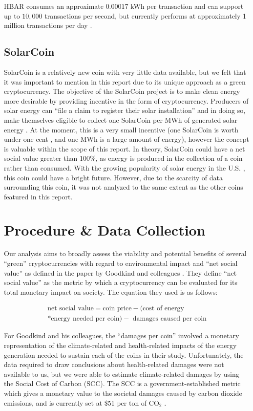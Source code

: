 \documentclass{article}
\begin{document}
HBAR consumes an approximate $0.00017$ kWh per transaction and can support up to $10,000$ transactions per second, but currently performs at approximately 1 million transactions per day \cite{hbar}.


\subsection{SolarCoin}
SolarCoin is a relatively new coin with very little data available, but we felt that it was important to mention in this report due to its unique approach as a green cryptocurrency. The objective of the SolarCoin project is to make clean energy more desirable by providing incentive in the form of cryptocurrency. Producers of solar energy can ``file a claim to register their solar installation'' and in doing so, make themselves eligible to collect one SolarCoin per MWh of generated solar energy \cite{solarcoin}. At the moment, this is a very small incentive (one SolarCoin is worth under one cent \cite{solarcoin_price}, and one MWh is a large amount of energy), however the concept is valuable within the scope of this report. In theory, SolarCoin could have a net social value greater than 100\%, as energy is produced in the collection of a coin rather than consumed. With the growing popularity of solar energy in the U.S. \cite{solar}, this coin could have a bright future. However, due to the scarcity of data surrounding this coin, it was not analyzed to the same extent as the other coins featured in this report.

\section{Procedure \& Data Collection}
Our analysis aims to broadly assess the viability and potential benefits of several ``green'' cryptocurrencies with regard to environmental impact and ``net social value'' as defined in the paper by Goodkind and colleagues \cite{goodkind}. They define ``net social value'' as the metric by which a cryptocurrency can be evaluated for its total monetary impact on society. The equation they used is as follows: 

\begin{multline*}
\text{net social value} = \text{coin price} - (\text{cost of energy} \\ 
* \text{energy needed per coin}) - \text{ damages caused per coin}
\end{multline*}

For Goodkind and his colleagues, the ``damages per coin'' involved a monetary representation of the climate-related and health-related impacts of the energy generation needed to sustain each of the coins in their study. Unfortunately, the data required to draw conclusions about health-related damages were not available to us, but we were able to estimate climate-related damages by using the Social Cost of Carbon (SCC). The SCC is a government-established metric which gives a monetary value to the societal damages caused by carbon dioxide emissions, and is currently set at \$51 per ton of $\text{CO}_2$ \cite{scc}.
\end{document}
